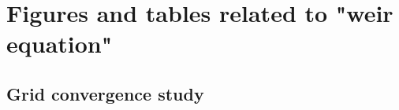 
\chapter{Figures and tables related to "weir equation"}
\label{AppendixA}

\section{Grid convergence study}
